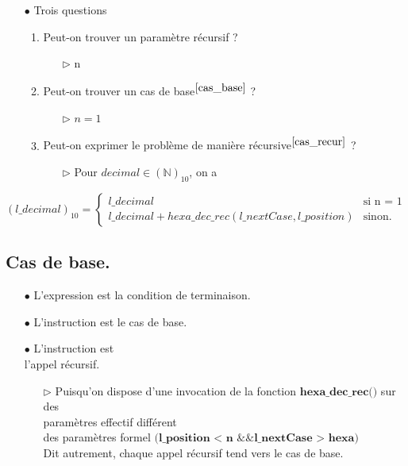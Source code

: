 \documentclass[a4paper, 11pt, oneside]{article}
\begin{document}
		\begin{itemize}
			\item[$\bullet$] Trois questions
			\begin{enumerate}
				\item Peut-on trouver un paramètre récursif ?
				\begin{itemize}
					\item[$\triangleright$] n
				\end{itemize}
				\item Peut-on trouver un cas de base$^{\ref{cas_base}}$ ?
				\begin{itemize}
					\item[$\triangleright$] $n = 1$
				\end{itemize}
				\item Peut-on exprimer le problème de manière récursive$^{\ref{cas_recur}}$ ?
				\begin{itemize}
					\item[$\triangleright$] Pour $decimal \in (\mathbb{N})_{10}$, on a
				\end{itemize}
			\end{enumerate} 
		\end{itemize}
		
		$
		(l\_decimal)_{10} = \left\{
    	\begin{array}{ll}
        		l\_decimal & \mbox{si n = 1}  \\
        		l\_decimal + hexa\_dec\_rec(l\_nextCase, l\_position) & \mbox{sinon.}
    	\end{array}
		\right.
		$
	
	\subsection{Cas de base.}\label{cas_base}
	
		\begin{itemize}
			\item[$\bullet$] L'expression  est la condition de terminaison.
			\item[$\bullet$] L'instruction  est le cas de base.
			\item[$\bullet$] L'instruction  est 
							\\ l’appel récursif.
			\begin{itemize}
				\item[$\triangleright$] Puisqu’on dispose d’une invocation de la fonction $\textbf{hexa\_dec\_rec()}$ sur des 
										\\ paramètres effectif différent 
										\\ des paramètres formel $\textbf{(l\_position < n \&\& l\_nextCase > hexa)}$ 
										\\ Dit autrement, chaque appel récursif tend vers le cas de base.
			\end{itemize}
		\end{itemize}
	
\end{document}
